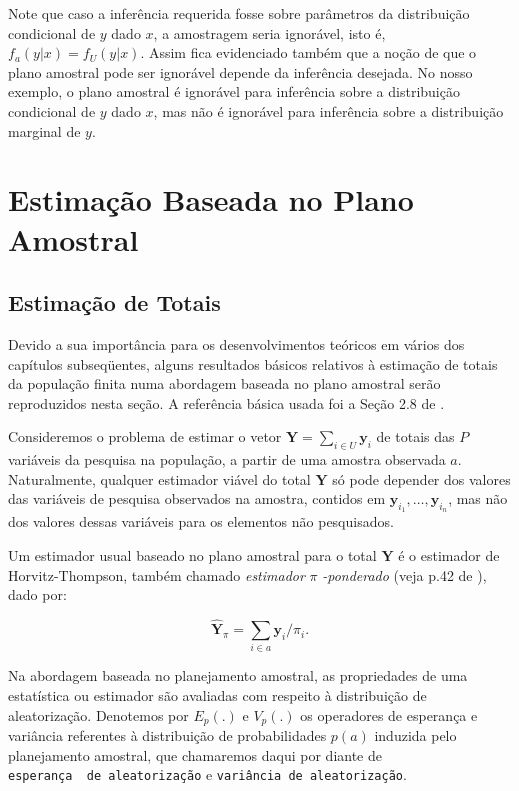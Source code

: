 \documentclass[]{book}
\numberwithin{example}{chapter}
\numberwithin{remark}{chapter}
\numberwithin{definition}{chapter}
\begin{document}
Note que caso a inferência requerida fosse sobre parâmetros da
distribuição condicional de \(y\) dado \(x\), a amostragem seria
ignorável, isto é, \(f_a ( y | x) = f_U (y | x)\). Assim fica
evidenciado também que a noção de que o plano amostral pode ser
ignorável depende da inferência desejada. No nosso exemplo, o plano
amostral é ignorável para inferência sobre a distribuição condicional de
\(y\) dado \(x\), mas não é ignorável para inferência sobre a
distribuição marginal de \(y\).

\chapter{Estimação Baseada no Plano Amostral}\label{capplanamo}

\section{Estimação de Totais}\label{estimatotais}

Devido a sua importância para os desenvolvimentos teóricos em vários dos
capítulos subseqüentes, alguns resultados básicos relativos à estimação
de totais da população finita numa abordagem baseada no plano amostral
serão reproduzidos nesta seção. A referência básica usada foi a Seção
2.8 de \citep{SSW92}.

Consideremos o problema de estimar o vetor
\(\mathbf{Y}=\sum_{i \in U}\mathbf{y}_i\) de totais das \(P\) variáveis
da pesquisa na população, a partir de uma amostra observada \(a\).
Naturalmente, qualquer estimador viável do total \(\mathbf{Y}\) só pode
depender dos valores das variáveis de pesquisa observados na amostra,
contidos em \(\mathbf{y}_{i_{1}}, \ldots , \mathbf{y}_{i_{n}}\), mas não
dos valores dessas variáveis para os elementos não pesquisados.

Um estimador usual baseado no plano amostral para o total \(\mathbf{Y}\)
é o estimador de Horvitz-Thompson, também chamado \emph{estimador}
\(\pi\) \emph{-ponderado} (veja p.42 de \citep{SSW92}), dado por:

\begin{equation}
\hat{\mathbf{Y}}_\pi = \sum_{i \in a} \mathbf{y}_i / \pi_{i} . \label{eq:estpa1}
\end{equation}

Na abordagem baseada no planejamento amostral, as propriedades de uma
estatística ou estimador são avaliadas com respeito à distribuição de
aleatorização. Denotemos por \(E_p(.)\) e \(V_p(.)\) os operadores de
esperança e variância referentes à distribuição de probabilidades
\(p(a)\) induzida pelo planejamento amostral, que chamaremos daqui por
diante de \texttt{esperança\ \ de\ aleatorização} e
\texttt{variância\ de\ aleatorização}.
\end{document}

